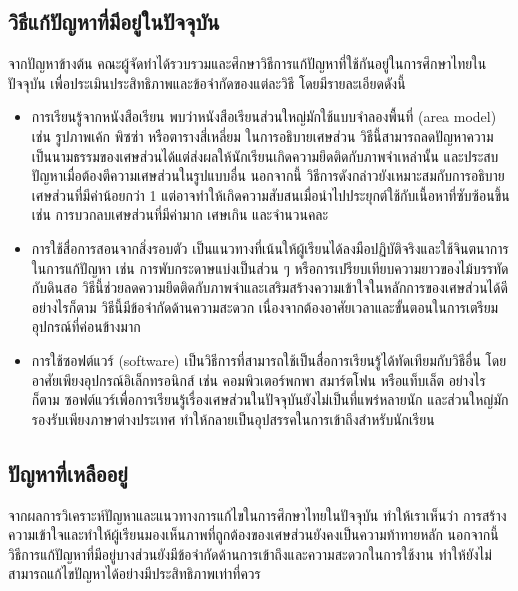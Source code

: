 \subsection{วิธีแก้ปัญหาที่มีอยู่ในปัจจุบัน}
จากปัญหาข้างต้น คณะผู้จัดทำได้รวบรวมและศึกษาวิธีการแก้ปัญหาที่ใช้กันอยู่ในการศึกษาไทยในปัจจุบัน เพื่อประเมินประสิทธิภาพและข้อจำกัดของแต่ละวิธี โดยมีรายละเอียดดังนี้
\begin{itemize}
    \item การเรียนรู้จากหนังสือเรียน พบว่าหนังสือเรียนส่วนใหญ่มักใช้แบบจำลองพื้นที่ (area model) เช่น รูปภาพเค้ก พิซซ่า หรือตารางสี่เหลี่ยม ในการอธิบายเศษส่วน 
    วิธีนี้สามารถลดปัญหาความเป็นนามธรรมของเศษส่วนได้แต่ส่งผลให้นักเรียนเกิดความยึดติดกับภาพจำเหล่านั้น และประสบปัญหาเมื่อต้องตีความเศษส่วนในรูปแบบอื่น นอกจากนี้ 
    วิธีการดังกล่าวยังเหมาะสมกับการอธิบายเศษส่วนที่มีค่าน้อยกว่า 1 แต่อาจทำให้เกิดความสับสนเมื่อนำไปประยุกต์ใช้กับเนื้อหาที่ซับซ้อนขึ้น 
    เช่น การบวกลบเศษส่วนที่มีค่ามาก เศษเกิน และจำนวนคละ
    \item การใช้สื่อการสอนจากสิ่งรอบตัว เป็นแนวทางที่เน้นให้ผู้เรียนได้ลงมือปฏิบัติจริงและใช้จินตนาการในการแก้ปัญหา 
    เช่น การพับกระดาษแบ่งเป็นส่วน ๆ หรือการเปรียบเทียบความยาวของไม้บรรทัดกับดินสอ 
    วิธีนี้ช่วยลดความยึดติดกับภาพจำและเสริมสร้างความเข้าใจในหลักการของเศษส่วนได้ดี อย่างไรก็ตาม วิธีนี้มีข้อจำกัดด้านความสะดวก 
    เนื่องจากต้องอาศัยเวลาและขั้นตอนในการเตรียมอุปกรณ์ที่ค่อนข้างมาก
    \item การใช้ซอฟต์แวร์ (software) เป็นวิธีการที่สามารถใช้เป็นสื่อการเรียนรู้ได้ทัดเทียมกับวิธีอื่น โดยอาศัยเพียงอุปกรณ์อิเล็กทรอนิกส์ 
    เช่น คอมพิวเตอร์พกพา สมาร์ตโฟน หรือแท็บเล็ต อย่างไรก็ตาม ซอฟต์แวร์เพื่อการเรียนรู้เรื่องเศษส่วนในปัจจุบันยังไม่เป็นที่แพร่หลายนัก 
    และส่วนใหญ่มักรองรับเพียงภาษาต่างประเทศ ทำให้กลายเป็นอุปสรรคในการเข้าถึงสำหรับนักเรียน
\end{itemize}
 
\subsection{ปัญหาที่เหลืออยู่}
จากผลการวิเคราะห์ปัญหาและแนวทางการแก้ไขในการศึกษาไทยในปัจจุบัน ทำให้เราเห็นว่า การสร้างความเข้าใจและทำให้ผู้เรียนมองเห็นภาพที่ถูกต้องของเศษส่วนยังคงเป็นความท้าทายหลัก นอกจากนี้ วิธีการแก้ปัญหาที่มีอยู่บางส่วนยังมีข้อจำกัดด้านการเข้าถึงและความสะดวกในการใช้งาน ทำให้ยังไม่สามารถแก้ไขปัญหาได้อย่างมีประสิทธิภาพเท่าที่ควร

